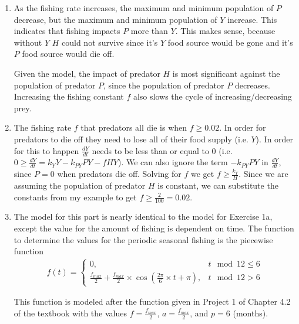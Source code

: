 \documentclass[12pt]{article}
\begin{document}
\begin{enumerate}
\begin{enumerate}
		\item
			As the fishing rate increases, the maximum and minimum population of $P$ decrease, but the maximum and minimum population of $Y$ increase. This indicates that fishing impacts $P$ more than $Y$. This makes sense, because without $Y$ $H$ could not survive since it's $Y$ food source would be gone and it's $P$ food source would die off.
			
			Given the model, the impact of predator $H$ is most significant against the population of predator $P$, since the population of predator $P$ decreases. Increasing the fishing constant $f$ also slows the cycle of increasing/decreasing prey.
						
		\item
			The fishing rate $f$ that predators all die is when $f \ge 0.02$. In order for predators to die off they need to lose all of their food supply (i.e. $Y$). In order for this to happen $\frac{dY}{dt}$ needs to be less than or equal to 0 (i.e. $0 \ge \frac{dY}{dt} = k_{Y}Y - k_{PY}PY - fHY$). We can also ignore the term $-k_{PY}PY$ in $\frac{dY}{dt}$, since $P = 0$ when predators die off. Solving for $f$ we get $f \ge \frac{k_Y}{H}$. Since we are assuming the population of predator $H$ is constant, we can substitute the constants from my example to get $f \ge \frac{2}{100} = 0.02$.
			
		\item
			The model for this part is nearly identical to the model for Exercise 1a, except the value for the amount of fishing is dependent on time. The function to determine the values for the periodic seasonal fishing is the piecewise function
			\begin{align}
  			f(t) = 
      	\begin{cases}
					0,& t \mod 12 \le 6\\
					\frac{f_{max}}{2} + \frac{f_{max}}{2} \times \cos(\frac{2\pi}{6} \times t + \pi),& t \mod 12 > 6
      	\end{cases}
			\end{align}
			
			This function is modeled after the function given in Project 1 of Chapter 4.2 of the textbook with the values $f = \frac{f_{max}}{2}$, $a = \frac{f_{max}}{2}$, and $p = 6$ (months).
			

\end{enumerate}
\end{enumerate}
\end{document}
